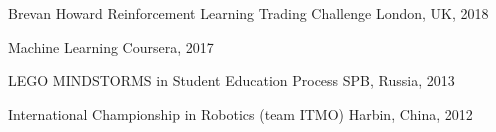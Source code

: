 

\begin{cvhonors}
            {Brevan Howard Reinforcement Learning Trading Challenge} %
            {London, UK, 2018} %
            {\faTrophy} %

            {Machine Learning} %
            {Coursera, 2017} %
            {\faAward} %

            {LEGO MINDSTORMS in Student Education Process} %
            {SPB, Russia, 2013} %
            {\faCertificate} %

            {International Championship in Robotics (team ITMO)} %
            {Harbin, China, 2012} %
            {\faTrophy} %

\end{cvhonors}
